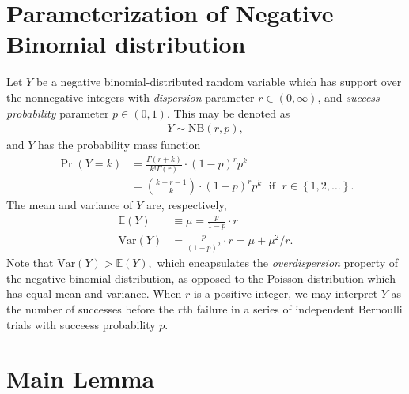 \documentclass[11pt]{article}
\newcommand{\1}{\mathbf{1}}
\newcommand{\0}{\mathbf{0}}
\begin{document}
\section{Parameterization of Negative Binomial distribution}\label{NBdist}

Let $Y$ be a negative binomial-distributed random variable which has support over the nonnegative integers with \emph{dispersion} parameter $r \in {(0,\infty)}$, and \emph{success probability} parameter $p \in (0, 1)$. This may be denoted as 
%
%
\begin{align*}
	Y \sim \text{NB}(r, p),
\end{align*}
%
%
and $Y$ has the probability mass function
%
%
\begin{align*}
	\Pr(Y = k) &= \frac{\Gamma(r + k)}{k! \Gamma(r)} \cdot (1-p)^{r} p^{k} \\
	&= \binom{k + r - 1}{k} \cdot (1-p)^{r} p^{k} \;\text{  if  }\; r\in \left\{ 1, 2, \ldots \right\}.
\end{align*}
%
%
The mean and variance of $Y$ are, respectively,
%
%
\begin{align*}
	\mathbb{E}(Y) &\equiv \mu = \frac{p}{1-p} \cdot r \\
	\text{Var}(Y) &= \frac{p}{(1-p)^2} \cdot r = \mu + \mu^2 / r.
\end{align*}
%
%
Note that $\text{Var}(Y) > \mathbb{E}(Y),$ which encapsulates the \emph{overdispersion} property of the negative binomial distribution, as opposed to the Poisson distribution which has equal mean and variance. When $r$ is a positive integer, we may interpret $Y$ as the number of successes before the $r$th failure in a series of independent Bernoulli trials with succeess probability $p$. 


\section{Main Lemma}\label{mainlemma}
\end{document}
